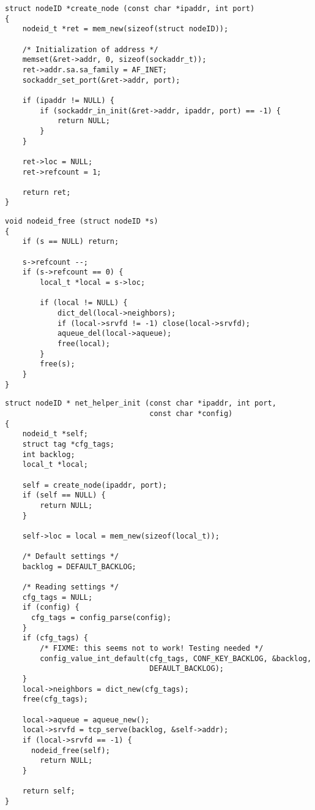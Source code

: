 \begin{lstlisting}
struct nodeID *create_node (const char *ipaddr, int port)
{
    nodeid_t *ret = mem_new(sizeof(struct nodeID));

    /* Initialization of address */
    memset(&ret->addr, 0, sizeof(sockaddr_t));
    ret->addr.sa.sa_family = AF_INET;
    sockaddr_set_port(&ret->addr, port);

    if (ipaddr != NULL) {
        if (sockaddr_in_init(&ret->addr, ipaddr, port) == -1) {
            return NULL;
        }
    }

    ret->loc = NULL;
    ret->refcount = 1;

    return ret;
}
\end{lstlisting}

\begin{lstlisting}
void nodeid_free (struct nodeID *s)
{
    if (s == NULL) return;

    s->refcount --;
    if (s->refcount == 0) {
        local_t *local = s->loc;

        if (local != NULL) {
            dict_del(local->neighbors);
            if (local->srvfd != -1) close(local->srvfd);
            aqueue_del(local->aqueue);
            free(local);
        }
        free(s);
    }
}
\end{lstlisting}

\begin{lstlisting}
struct nodeID * net_helper_init (const char *ipaddr, int port,
                                 const char *config)
{
    nodeid_t *self;
    struct tag *cfg_tags;
    int backlog;
    local_t *local;

    self = create_node(ipaddr, port);
    if (self == NULL) {
        return NULL;
    }

    self->loc = local = mem_new(sizeof(local_t));

    /* Default settings */
    backlog = DEFAULT_BACKLOG;

    /* Reading settings */
    cfg_tags = NULL;
    if (config) {
      cfg_tags = config_parse(config);
    }
    if (cfg_tags) {
        /* FIXME: this seems not to work! Testing needed */
        config_value_int_default(cfg_tags, CONF_KEY_BACKLOG, &backlog,
                                 DEFAULT_BACKLOG);
    }
    local->neighbors = dict_new(cfg_tags);
    free(cfg_tags);

    local->aqueue = aqueue_new();
    local->srvfd = tcp_serve(backlog, &self->addr);
    if (local->srvfd == -1) {
      nodeid_free(self);
        return NULL;
    }

    return self;
}
\end{lstlisting}

